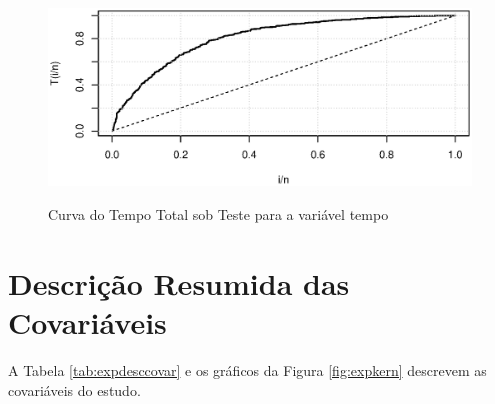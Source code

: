 \documentclass[
	12pt,				%
	openright,			%
	twoside,			%
	a4paper,			%
	english,			%
	brazil				%
	]{abntex2}
\begin{document}
\begin{figure}[!ht]
	\centering
    \caption{Curva do Tempo Total sob Teste para a variável tempo}
    \includegraphics[scale = 0.9]{Rplot02}
    \label{fig:exp3}
\end{figure}

\section{Descrição Resumida das Covariáveis}
A Tabela \ref{tab:expdesccovar} e os gráficos da Figura \ref{fig:expkern} descrevem as covariáveis do estudo. 
\end{document}
